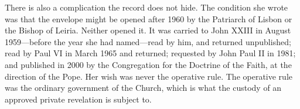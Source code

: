 There is also a complication the record does not hide. The condition
she wrote was that the envelope might be opened after 1960 by the
Patriarch of Lisbon or the Bishop of Leiria. Neither opened it. It
was carried to John XXIII in August 1959---before the year she had
named---read by him, and returned unpublished; read by Paul VI in
March 1965 and returned; requested by John Paul II in 1981; and
published in 2000 by the Congregation for the Doctrine of the Faith,
at the direction of the Pope. Her wish was never the operative rule.
The operative rule was the ordinary government of the Church, which
is what the custody of an approved private revelation is subject
to.

